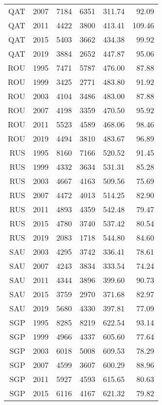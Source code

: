 \begin{longtable}{|r|r|r|r|r|r|}
    QAT   & 2007  & 7184  & 6351  & 311.74 & 92.09 \\
    QAT   & 2011  & 4422  & 3800  & 413.41 & 109.46 \\
    QAT   & 2015  & 5403  & 3662  & 434.38 & 99.92 \\
    QAT   & 2019  & 3884  & 2652  & 447.87 & 95.06 \\
    ROU   & 1995  & 7471  & 5787  & 476.00 & 87.88 \\
    ROU   & 1999  & 3425  & 2771  & 483.80 & 91.92 \\
    ROU   & 2003  & 4104  & 3486  & 483.00 & 87.88 \\
    ROU   & 2007  & 4198  & 3359  & 470.50 & 95.92 \\
    ROU   & 2011  & 5523  & 4589  & 468.06 & 98.46 \\
    ROU   & 2019  & 4494  & 3810  & 483.67 & 96.89 \\
    RUS   & 1995  & 8160  & 7166  & 520.52 & 91.45 \\
    RUS   & 1999  & 4332  & 3634  & 531.31 & 85.28 \\
    RUS   & 2003  & 4667  & 4163  & 509.56 & 75.69 \\
    RUS   & 2007  & 4472  & 4013  & 514.25 & 82.90 \\
    RUS   & 2011  & 4893  & 4359  & 542.48 & 79.47 \\
    RUS   & 2015  & 4780  & 3740  & 537.42 & 80.54 \\
    RUS   & 2019  & 2083  & 1718  & 544.80 & 84.60 \\
    SAU   & 2003  & 4295  & 3742  & 336.41 & 78.61 \\
    SAU   & 2007  & 4243  & 3834  & 333.54 & 74.24 \\
    SAU   & 2011  & 4344  & 3896  & 399.60 & 90.73 \\
    SAU   & 2015  & 3759  & 2970  & 371.68 & 82.97 \\
    SAU   & 2019  & 5680  & 4330  & 397.81 & 77.09 \\
    SGP   & 1995  & 8285  & 8219  & 622.54 & 93.14 \\
    SGP   & 1999  & 4966  & 4337  & 605.60 & 77.64 \\
    SGP   & 2003  & 6018  & 5008  & 609.53 & 78.29 \\
    SGP   & 2007  & 4599  & 3607  & 600.29 & 88.96 \\
    SGP   & 2011  & 5927  & 4593  & 615.65 & 80.63 \\
    SGP   & 2015  & 6116  & 4167  & 621.32 & 79.82 \\

\end{longtable}
